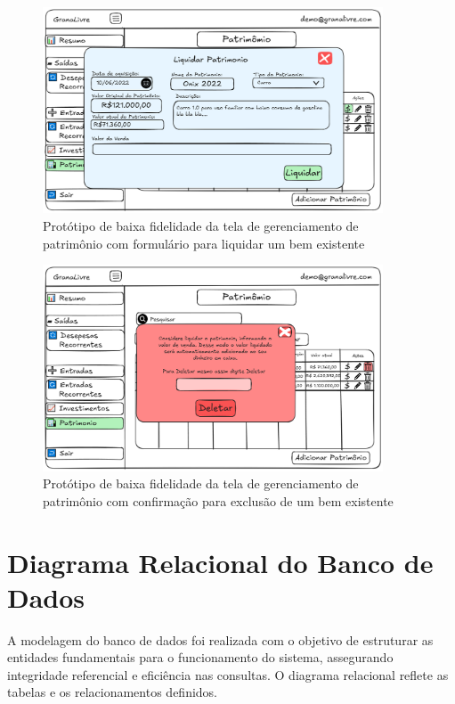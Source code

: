 \begin{figure}[H]
    \centering
    \includegraphics[width=0.9\textwidth]{imgs/09-patrimonio5.png}
    \caption{Protótipo de baixa fidelidade da tela de gerenciamento de patrimônio com formulário para liquidar um bem existente}
    \label{fig:prot_patrimonio5}
\end{figure}

\begin{figure}[H]
    \centering
    \includegraphics[width=0.9\textwidth]{imgs/09-patrimonio6.png}
    \caption{Protótipo de baixa fidelidade da tela de gerenciamento de patrimônio com confirmação para exclusão de um bem existente}
    \label{fig:prot_patrimonio6}
\end{figure}


\section{Diagrama Relacional do Banco de Dados}
A modelagem do banco de dados foi realizada com o objetivo de estruturar as entidades fundamentais para o funcionamento do sistema, assegurando integridade referencial e eficiência nas consultas. O diagrama relacional reflete as tabelas e os relacionamentos definidos.

